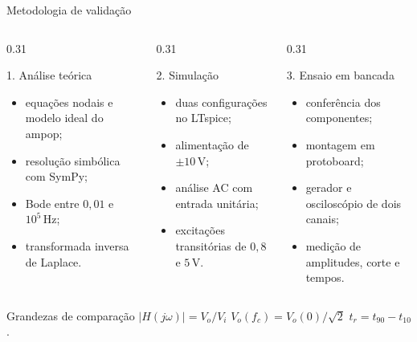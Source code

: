 \begin{frame}{Metodologia de validação}
  \small
  \begin{columns}[T,onlytextwidth]
    \begin{column}{0.31\textwidth}
      \begin{block}{1. Análise teórica}
        \begin{itemize}
          \item equações nodais e modelo ideal do ampop;
          \item resolução simbólica com SymPy;
          \item Bode entre $0{,}01$ e $10^5\,\mathrm{Hz}$;
          \item transformada inversa de Laplace.
        \end{itemize}
      \end{block}
    \end{column}
    \begin{column}{0.31\textwidth}
      \begin{block}{2. Simulação}
        \begin{itemize}
          \item duas configurações no LTspice;
          \item alimentação de $\pm10\,\mathrm{V}$;
          \item análise AC com entrada unitária;
          \item excitações transitórias de $0{,}8$ e $5\,\mathrm{V}$.
        \end{itemize}
      \end{block}
    \end{column}
    \begin{column}{0.31\textwidth}
      \begin{block}{3. Ensaio em bancada}
        \begin{itemize}
          \item conferência dos componentes;
          \item montagem em protoboard;
          \item gerador e osciloscópio de dois canais;
          \item medição de amplitudes, corte e tempos.
        \end{itemize}
      \end{block}
    \end{column}
  \end{columns}

  \begin{alertblock}{Grandezas de comparação}
    \centering
    $|H(j\omega)|=V_o/V_i$
    \qquad
    $V_o(f_c)=V_o(0)/\sqrt{2}$
    \qquad
    $t_r=t_{90}-t_{10}$.
  \end{alertblock}
\end{frame}
